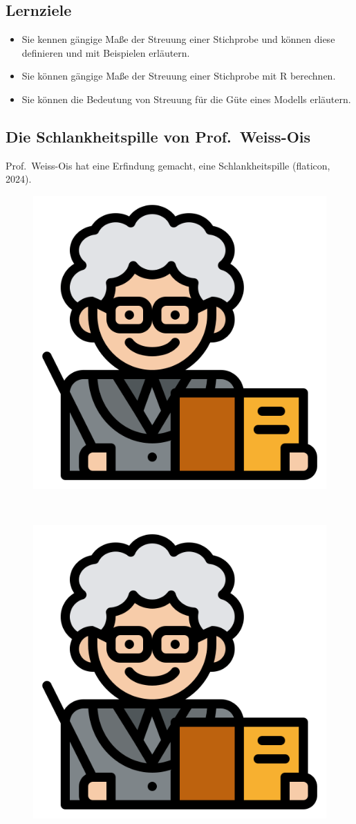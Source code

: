 \documentclass[
  letterpaper,
  twoside,
  open=any]{scrbook}
\providecommand{\tightlist}{%
  \setlength{\itemsep}{0pt}\setlength{\parskip}{0pt}}\usepackage{longtable,booktabs,array}
\theoremstyle{definition}
\theoremstyle{definition}
\theoremstyle{definition}
\theoremstyle{remark}
\begin{document}
\subsection{Lernziele}\label{lernziele-6}

\begin{itemize}
\tightlist
\item
  Sie kennen gängige Maße der Streuung einer Stichprobe und können diese
  definieren und mit Beispielen erläutern.
\item
  Sie können gängige Maße der Streuung einer Stichprobe mit R berechnen.
\item
  Sie können die Bedeutung von Streuung für die Güte eines Modells
  erläutern.
\end{itemize}

\subsection{Die Schlankheitspille von
Prof.~Weiss-Ois}\label{sec-weiss-ois}

Prof.~Weiss-Ois hat eine Erfindung gemacht, eine Schlankheitspille
(flaticon, 2024).

\begin{figure}

\begin{minipage}{0.46\linewidth}

\includegraphics[width=0.25\linewidth,height=\textheight,keepaspectratio]{img/teacher.png}

\end{minipage}%
%
\begin{minipage}{0.09\linewidth}
~\end{minipage}%
%
\begin{minipage}{0.46\linewidth}

\includegraphics[width=0.25\linewidth,height=\textheight,keepaspectratio]{img/teacher.png}

\end{minipage}%

\end{figure}%
\end{document}
